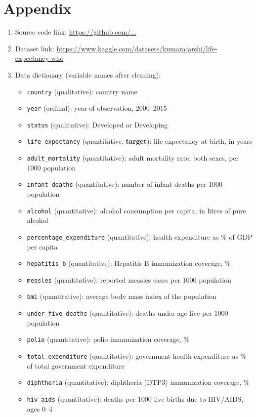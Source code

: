 \documentclass[12pt,a4paper]{article}
\begin{document}
\section{Appendix}
\begin{enumerate}
  \item Source code link: \url{https://github.com/...}
  \item Dataset link: \url{https://www.kaggle.com/datasets/kumarajarshi/life-expectancy-who}
  \item Data dictionary (variable names after cleaning):
  \begin{itemize}
    \item \texttt{country} (qualitative): country name
    \item \texttt{year} (ordinal): year of observation, 2000--2015
    \item \texttt{status} (qualitative): Developed or Developing
    \item \texttt{life\_expectancy} (quantitative, \textbf{target}): life expectancy at birth, in years
    \item \texttt{adult\_mortality} (quantitative): adult mortality rate, both sexes, per 1000 population
    \item \texttt{infant\_deaths} (quantitative): number of infant deaths per 1000 population
    \item \texttt{alcohol} (quantitative): alcohol consumption per capita, in litres of pure alcohol
    \item \texttt{percentage\_expenditure} (quantitative): health expenditure as \% of GDP per capita
    \item \texttt{hepatitis\_b} (quantitative): Hepatitis B immunization coverage, \%
    \item \texttt{measles} (quantitative): reported measles cases per 1000 population
    \item \texttt{bmi} (quantitative): average body mass index of the population
    \item \texttt{under\_five\_deaths} (quantitative): deaths under age five per 1000 population
    \item \texttt{polio} (quantitative): polio immunization coverage, \%
    \item \texttt{total\_expenditure} (quantitative): government health expenditure as \% of total government expenditure
    \item \texttt{diphtheria} (quantitative): diphtheria (DTP3) immunization coverage, \%
    \item \texttt{hiv\_aids} (quantitative): deaths per 1000 live births due to HIV/AIDS, ages 0--4

\end{itemize}
\end{enumerate}
\end{document}

